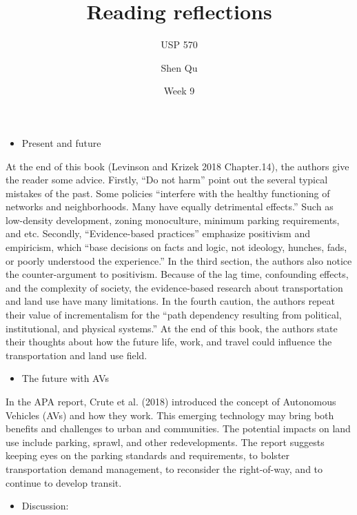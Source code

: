 \documentclass[12pt,]{article}
\title{Reading reflections}
\subtitle{USP 570}
\author{Shen Qu}
\date{Week 9}
\providecommand{\tightlist}{%
  \setlength{\itemsep}{0pt}\setlength{\parskip}{0pt}}
\begin{document}
\maketitle

\begin{itemize}
\tightlist
\item
  Present and future
\end{itemize}

At the end of this book (Levinson and Krizek 2018 Chapter.14), the
authors give the reader some advice. Firstly, ``Do not harm'' point out
the several typical mistakes of the past. Some policies ``interfere with
the healthy functioning of networks and neighborhoods. Many have equally
detrimental effects.'' Such as low-density development, zoning
monoculture, minimum parking requirements, and etc. Secondly,
``Evidence-based practices'' emphasize positivism and empiricism, which
``base decisions on facts and logic, not ideology, hunches, fads, or
poorly understood the experience.'' In the third section, the authors
also notice the counter-argument to positivism. Because of the lag time,
confounding effects, and the complexity of society, the evidence-based
research about transportation and land use have many limitations. In the
fourth caution, the authors repeat their value of incrementalism for the
``path dependency resulting from political, institutional, and physical
systems.'' At the end of this book, the authors state their thoughts
about how the future life, work, and travel could influence the
transportation and land use field.

\begin{itemize}
\tightlist
\item
  The future with AVs
\end{itemize}

In the APA report, Crute et al. (2018) introduced the concept of
Autonomous Vehicles (AVs) and how they work. This emerging technology
may bring both benefits and challenges to urban and communities. The
potential impacts on land use include parking, sprawl, and other
redevelopments. The report suggests keeping eyes on the parking
standards and requirements, to bolster transportation demand management,
to reconsider the right-of-way, and to continue to develop transit.

\begin{itemize}
\tightlist
\item
  Discussion:
\end{itemize}
\end{document}
